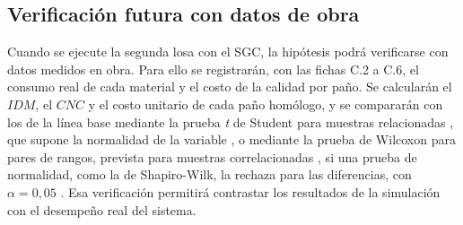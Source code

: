 \subsection{Verificación futura con datos de obra}
\label{sec:verificacion-futura}

Cuando se ejecute la segunda losa con el SGC, la hipótesis podrá verificarse con datos medidos en obra. Para ello se registrarán, con las fichas C.2 a C.6, el consumo real de cada material y el costo de la calidad por paño. Se calcularán el $IDM$, el $CNC$ y el costo unitario de cada paño homólogo, y se compararán con los de la línea base mediante la prueba \emph{t} de Student para muestras relacionadas \parencite[pp.~352--353, 372]{hernandez2018}, que supone la normalidad de la variable \parencite[p.~345]{hernandez2018}, o mediante la prueba de Wilcoxon para pares de rangos, prevista para muestras correlacionadas \parencite[p.~372]{hernandez2018}, si una prueba de normalidad, como la de Shapiro-Wilk, la rechaza para las diferencias, con $\alpha = 0{,}05$ \parencite[p.~342]{hernandez2018}.  Esa verificación permitirá contrastar los resultados de la simulación con el desempeño real del sistema.
